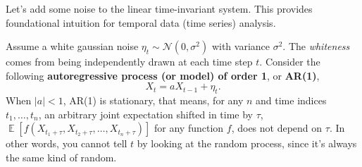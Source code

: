 \documentclass[letterpaper,11pt]{exam}
\DeclareMathOperator*{\E}{\mathbb{E}} %
\DeclareMathOperator*{\var}{var}
\DeclareMathOperator*{\cov}{cov}
\begin{document}
\begin{questions}
\newpage

Let's add some noise to the linear time-invariant system.
This provides foundational intuition for temporal data (time series) analysis.

\question Assume a white gaussian noise $\eta_t \sim \mathcal{N}(0, \sigma^2)$ with variance $\sigma^2$.
The \textit{whiteness} comes from being independently drawn at each time step $t$.
Consider the following \textbf{autoregressive process (or model) of order 1}, or \textbf{AR(1)},
\begin{equation}\label{eq:ar1}
    X_t = a X_{t-1} + \eta_t.
\end{equation}
When $|a| < 1$, AR(1) is stationary, that means, for any $n$ and time indices $t_1, \ldots, t_n$, an arbitrary joint expectation shifted in time by $\tau$, $\E[f(X_{t_1+\tau}, X_{t_2+\tau}, \ldots, X_{t_n+\tau})]$ for any function $f$, does not depend on $\tau$.
In other words, you cannot tell $t$ by looking at the random process, since it's always the same kind of random.

\end{questions}
\end{document}
